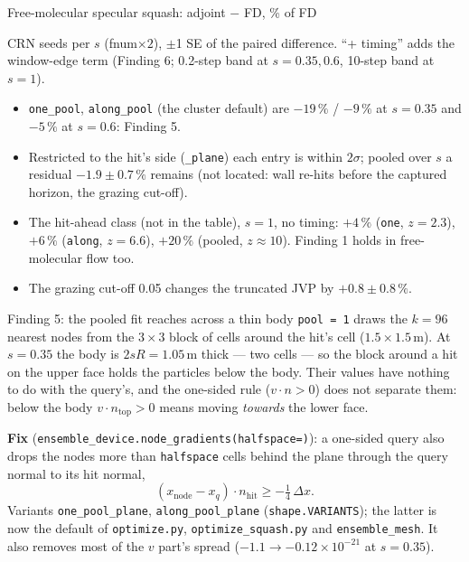 \documentclass[10pt,aspectratio=169]{beamer}
\newcommand{\code}[1]{\texttt{\small #1}}
\begin{document}
\begin{frame}{Free-molecular specular squash: adjoint $-$ FD, \% of FD}
\footnotesize


\normalsize
{} CRN seeds per $s$ (fnum$\times2$), $\pm$1 SE of the paired difference.  ``+ timing'' adds the
window-edge term (Finding 6; 0.2-step band at $s = 0.35, 0.6$, 10-step band at $s = 1$).
\begin{itemize}
\item \code{one\_pool}, \code{along\_pool} (the cluster default) are $-19\,\%$ / $-9\,\%$ at
  $s = 0.35$ and $-5\,\%$ at $s = 0.6$: Finding 5.
\item Restricted to the hit's side (\code{*\_plane}) each entry is within $2\sigma$; pooled
  over $s$ a residual $-1.9\pm0.7\,\%$ remains (not located: wall re-hits before the
  captured horizon, the grazing cut-off).
\item The hit-ahead class (not in the table), $s = 1$, no timing: $+4\,\%$ (\code{one},
  $z = 2.3$), $+6\,\%$ (\code{along}, $z = 6.6$), $+20\,\%$ (pooled, $z\approx10$).  Finding 1
  holds in free-molecular flow too.
\item The grazing cut-off 0.05 changes the truncated JVP by $+0.8\pm0.8\,\%$.
\end{itemize}
\end{frame}

\begin{frame}{Finding 5: the pooled fit reaches across a thin body}
\code{pool = 1} draws the $k = 96$ nearest nodes from the $3\times3$ block of cells around
the hit's cell ($1.5\times1.5$\,m).  At $s = 0.35$ the body is $2sR = 1.05$\,m thick ---
two cells --- so the block around a hit on the upper face holds the particles below the
body.  Their values have nothing to do with the query's, and the one-sided rule
($v\cdot n > 0$) does not separate them: below the body $v\cdot n_{\mathrm{top}} > 0$ means
moving \emph{towards} the lower face.

\medskip
\textbf{Fix} (\code{ensemble\_device.node\_gradients(halfspace=)}): a one-sided query also
drops the nodes more than \code{halfspace} cells behind the plane through the query normal to
its hit normal,
\[
(x_{\mathrm{node}} - x_q)\cdot n_{\mathrm{hit}} \ge -\tfrac14\,\Delta x .
\]
Variants \code{one\_pool\_plane}, \code{along\_pool\_plane} (\code{shape.VARIANTS}); the
latter is now the default of \code{optimize.py}, \code{optimize\_squash.py} and
\code{ensemble\_mesh}.  It also removes most of the $v$ part's spread ($-1.1\to-0.12\times10^{-21}$
at $s = 0.35$).
\end{frame}
\end{document}
